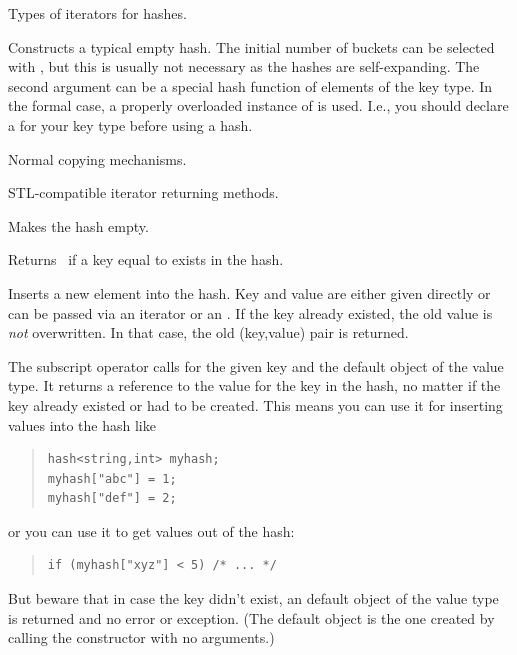 \documentclass[10pt]{article}
\begin{document}
Types of iterators for hashes.

Constructs a typical empty hash. The initial number of buckets can be
selected with , but this is usually not necessary as the
hashes are self-expanding. The second argument  can be a
special hash function of elements of the key type. In the formal case,
a properly overloaded instance of  is used. I.e., you
should declare a  for your key type before using a hash.

Normal copying mechanisms.

STL-compatible iterator returning methods.

Makes the hash empty.

Returns \true\ if a key equal to  exists in the hash.

Inserts a new element into the hash. Key and value are either given
directly or can be passed via an iterator or an .
If the key already existed, the old value is {\em not} overwritten. In
that case, the old (key,value) pair is returned.

The subscript operator calls  for the given key and the
default object of the value type. It returns a reference to the value
for the key in the hash, no matter if the key already existed or had
to be created. This means you can use it for inserting values into the
hash like
\begin{quote}
\begin{verbatim}
hash<string,int> myhash;
myhash["abc"] = 1;
myhash["def"] = 2;
\end{verbatim}
\end{quote}
or you can use it to get values out of the hash:
\begin{quote}
\begin{verbatim}
if (myhash["xyz"] < 5) /* ... */
\end{verbatim}
\end{quote}
But beware that in case the key didn't exist, an default object of the
value type is returned and no error or exception. (The default object
is the one created by calling the constructor with no arguments.)
\end{document}
